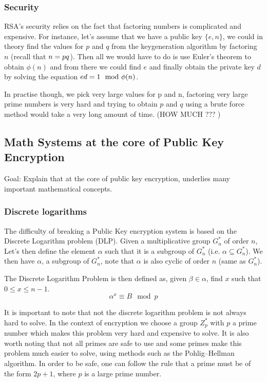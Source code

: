 \documentclass[conference]{IEEEtran}
\begin{document}
\subsubsection{Security}
RSA's security relies on the fact that factoring numbers is complicated and expensive.
For instance, let's assume that we have a public key $\{e,n\}$, we could in theory find
the values for $p$ and $q$ from the keygeneration algorithm by factoring $n$ (recall that $n = p\*q$). Then all we would have to do is 
use Euler's theorem to obtain $\phi(n)$ and from there we could find $e$ and finally 
obtain the private key $d$ by solving the equation $e\*d = 1\mod \phi(n)$.

In practise though, we pick very large values for p and n, factoring very large prime
numbers is very hard and trying to obtain $p$ and $q$ using a brute force method
would take a very long amount of time.
(HOW MUCH ??? )


\subsection{Math Systems at the core of Public Key Encryption}
Goal: Explain that at the core of public key encryption, underlies
many important mathematical concepts.


\subsubsection{Discrete logarithms}
The difficulty of breaking a Public Key encryption system is based on the 
Discrete Logarithm problem (DLP). 
Given a multiplicative group $G_{n}^{*}$ of order $n$,
Let's then define the element $\alpha$ such that it is a subgroup of $G_{n}^{*}$ 
(i.e. $\alpha \subseteq G_{n}^{*}$). We then have $\alpha$, a subgroup of $G_{n}^{*}$,
note that $\alpha$ is also cyclic of order $n$ (same as $G_{n}^{*}$).


The Discrete Logarithm Problem is then defined as, given $\beta \in \alpha$,
find $x$ such that $0 \leq x \leq n - 1$.
\begin{equation}
    \alpha^{x} \equiv B\mod p
\end{equation}

It is important to note that not the discrete logarithm problem
is not always hard to solve. In the context of encryption we choose a group
$Z_{p}^*$ with $p$ a prime number which makes this problem very hard and 
expensive to solve.
It is also worth noting that not all primes are safe to use and some primes
make this problem much easier to solve, using methods such as the 
Pohlig–Hellman algorithm. In order to be safe, one can follow the rule
that a prime must be of the form $2p + 1$, where $p$ is a large prime number. 
\end{document}
